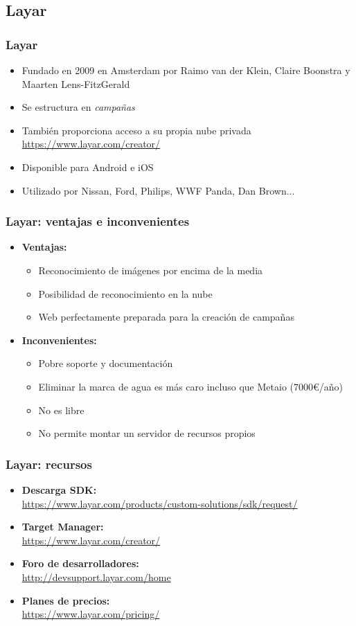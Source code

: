 \subsection*{Layar}
\frame
{
\frametitle{Layar}
\begin{itemize}
 \item Fundado en 2009 en Amsterdam por Raimo van der Klein, Claire Boonstra y Maarten Lens-FitzGerald
 \item Se estructura en \textit{campañas}
 \item También proporciona acceso a su propia nube privada\\
   \url{https://www.layar.com/creator/}
 \item Disponible para Android e iOS
 \item Utilizado por Nissan, Ford, Philips, WWF Panda, Dan Brown...
\end{itemize}
}

\frame
{
\frametitle{Layar: ventajas e inconvenientes}
\begin{itemize}
\item \textbf{Ventajas:}
  \begin{itemize}
   \item Reconocimiento de imágenes por encima de la media
   \item Posibilidad de reconocimiento en la nube
   \item Web perfectamente preparada para la creación de campañas
  \end{itemize}

\item \textbf{Inconvenientes:}
  \begin{itemize}
   \item Pobre soporte y documentación
   \item Eliminar la marca de agua es más caro incluso que Metaio (7000\euro/año)
   \item No es libre
   \item No permite montar un servidor de recursos propios
  \end{itemize}

\end{itemize}
}

\frame
{
\frametitle{Layar: recursos}
\begin{itemize}
\item \textbf{Descarga SDK:} \\\url{https://www.layar.com/products/custom-solutions/sdk/request/}
\item \textbf{Target Manager:} \\\url{https://www.layar.com/creator/}
\item \textbf{Foro de desarrolladores:} \\\url{http://devsupport.layar.com/home}
\item \textbf{Planes de precios:} \\\url{https://www.layar.com/pricing/}
\end{itemize}
}
